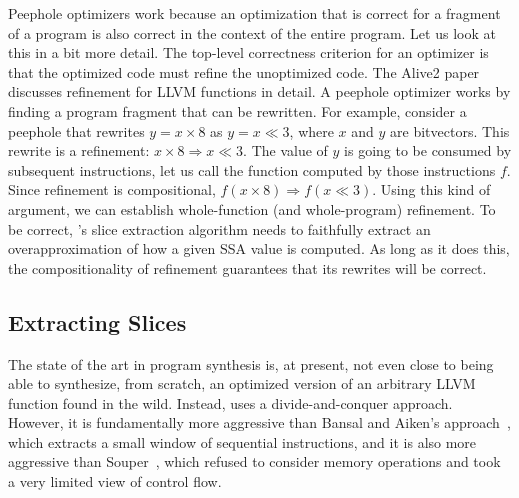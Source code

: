 Peephole optimizers work because an optimization that is correct for a
fragment of a program is also correct in the context of the entire
program.
%
Let us look at this in a bit more detail.
%
The top-level correctness criterion for an optimizer is that the
optimized code must refine the unoptimized code.
%
The Alive2 paper~\cite{alive2} discusses refinement for LLVM functions
in detail.
%
A peephole optimizer works by finding a program fragment that can be
rewritten.
%
For example, consider a peephole that rewrites $y = x \times 8$ as $y
= x \ll 3$, where $x$ and $y$ are bitvectors.
%
This rewrite is a refinement: $x \times 8 \Rightarrow x \ll 3$.
%
The value of $y$ is going to be consumed by subsequent instructions,
let us call the function computed by those instructions $f$.
%
Since refinement is compositional,
$f(x \times 8) \Rightarrow f(x \ll 3)$.
%
Using this kind of argument, we can establish whole-function (and
whole-program) refinement.
%
To be correct, \tool's slice extraction algorithm needs to faithfully
extract an overapproximation of how a given SSA value is computed.
%
As long as it does this, the compositionality of refinement guarantees
that its rewrites will be correct.


\subsection{Extracting Slices}

The state of the art in program synthesis is, at present, not even
close to being able to synthesize, from scratch, an optimized version
of an arbitrary LLVM function found in the wild.
%
Instead, \tool{} uses a divide-and-conquer approach.
%
However, it is fundamentally more aggressive than Bansal and Aiken's
approach~\cite{Bansal06}, which extracts a small window of sequential instructions,
and it is also more aggressive than Souper~\cite{souper}, which
refused to consider memory operations and took a very limited view of
control flow.


